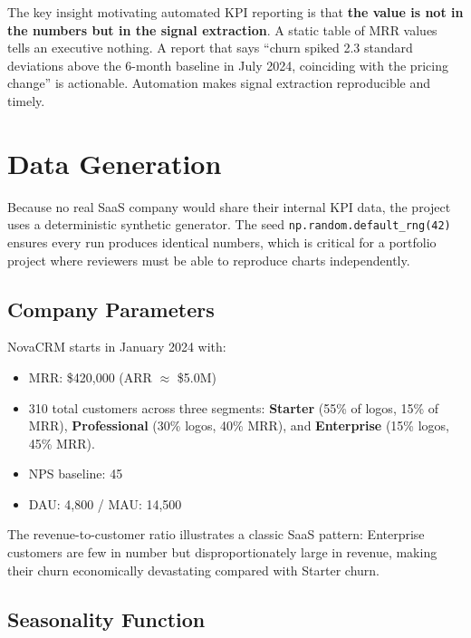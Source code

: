 \begin{keyinsight}
The key insight motivating automated KPI reporting is that \textbf{the value is not in the numbers but in the signal extraction}. A static table of MRR values tells an executive nothing. A report that says ``churn spiked 2.3 standard deviations above the 6-month baseline in July 2024, coinciding with the pricing change'' is actionable. Automation makes signal extraction reproducible and timely.
\end{keyinsight}

\section{Data Generation}
\label{sec:kpi-data}


Because no real SaaS company would share their internal KPI data, the project uses a deterministic synthetic generator. The seed \texttt{np.random.default\_rng(42)} ensures every run produces identical numbers, which is critical for a portfolio project where reviewers must be able to reproduce charts independently.

\subsection{Company Parameters}

NovaCRM starts in January 2024 with:
\begin{itemize}
  \item MRR: \$420,000 (ARR \(\approx\) \$5.0M)
  \item 310 total customers across three segments: \textbf{Starter} (55\% of logos, 15\% of MRR), \textbf{Professional} (30\% logos, 40\% MRR), and \textbf{Enterprise} (15\% logos, 45\% MRR).
  \item NPS baseline: 45
  \item DAU: 4,800 / MAU: 14,500
\end{itemize}

The revenue-to-customer ratio illustrates a classic SaaS pattern: Enterprise customers are few in number but disproportionately large in revenue, making their churn economically devastating compared with Starter churn.

\subsection{Seasonality Function}

